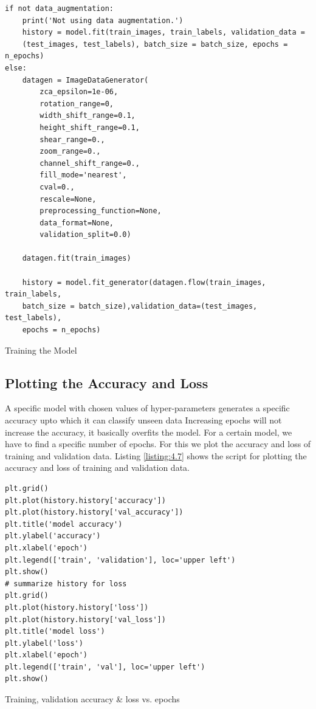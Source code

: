 \begin{longlisting}
    \begin{verbatim}
if not data_augmentation:
    print('Not using data augmentation.')
    history = model.fit(train_images, train_labels, validation_data =
    (test_images, test_labels), batch_size = batch_size, epochs = n_epochs)
else:
    datagen = ImageDataGenerator(
        zca_epsilon=1e-06,
        rotation_range=0,  
        width_shift_range=0.1,
        height_shift_range=0.1,
        shear_range=0.,
        zoom_range=0.,
        channel_shift_range=0.,
        fill_mode='nearest',
        cval=0.,
        rescale=None,
        preprocessing_function=None,
        data_format=None,
        validation_split=0.0)
    
    datagen.fit(train_images)
    
    history = model.fit_generator(datagen.flow(train_images, train_labels,
    batch_size = batch_size),validation_data=(test_images, test_labels),
    epochs = n_epochs)    
    \end{verbatim}
    \caption{Training the Model}
\label{listing:4.6}
\end{longlisting}
\subsection{Plotting the Accuracy and Loss}
A specific model with  chosen values of hyper-parameters
generates a specific accuracy upto which it can classify unseen data
Increasing epochs will not increase the accuracy, it basically overfits
the model. For a certain model, we have to find a specific number
of epochs. For this we plot the accuracy and loss of training and
validation data. Listing \ref{listing:4.7} shows the script for plotting the accuracy and
loss of training and validation data.

\begin{longlisting}
    \begin{verbatim}
plt.grid()
plt.plot(history.history['accuracy'])
plt.plot(history.history['val_accuracy'])
plt.title('model accuracy')
plt.ylabel('accuracy')
plt.xlabel('epoch')
plt.legend(['train', 'validation'], loc='upper left')
plt.show()
# summarize history for loss
plt.grid()
plt.plot(history.history['loss'])
plt.plot(history.history['val_loss'])
plt.title('model loss')
plt.ylabel('loss')
plt.xlabel('epoch')
plt.legend(['train', 'val'], loc='upper left')
plt.show()
\end{verbatim}
\caption{Training, validation accuracy \& loss vs. epochs}
\label{listing:4.7}
\end{longlisting}

